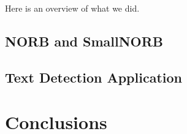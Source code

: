 \documentclass[12pt,a4paper,oneside,english]{UPBThesis}
\begin{document}
Here is an overview of what we did.

\section{NORB and SmallNORB}

\section{Text Detection Application}

\chapter{Conclusions}




\appendix
\end{document}
